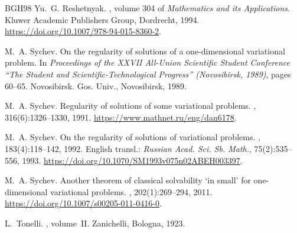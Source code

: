 \documentclass[reqno,12pt]{amsart}
\numberwithin{equation}{section}
\theoremstyle{remark}
\begin{document}
\begin{thebibliography}{BGH98}
Yu.~G. Reshetnyak.
, volume 304 of {\em Mathematics and its Applications}.
\newblock Kluwer Academic Publishers Group, Dordrecht, 1994. \url{https://doi.org/10.1007/978-94-015-8360-2}.

M.~A. Sychev.
\newblock On the regularity of solutions of a one-dimensional variational problem.
\newblock In {\em Proceedings of the {XXVII} {A}ll-{U}nion {S}cientific {S}tudent {C}onference ``{T}he {S}tudent and {S}cientific-{T}echnological {P}rogress'' ({N}ovosibirsk, 1989)}, pages 60--65. Novosibirsk. Gos. Univ., Novosibirsk, 1989.

M.~A. Sychev.
\newblock Regularity of solutions of some variational problems.
, 316(6):1326--1330, 1991. \url{https://www.mathnet.ru/eng/dan6178}.

M.~A. Sychev.
\newblock On the regularity of solutions of variational problems.
, 183(4):118--142, 1992. English transl.: {\em Russian Acad. Sci. Sb. Math.}, 75(2):535--556, 1993. \url{https://doi.org/10.1070/SM1993v075n02ABEH003397}.

M.~A. Sychev.
\newblock Another theorem of classical solvability `in small' for one-dimensional variational problems.
, 202(1):269--294, 2011. \url{https://doi.org/10.1007/s00205-011-0416-0}.

L.~Tonelli.
, volume~II.
\newblock Zanichelli, Bologna, 1923.

\end{thebibliography}
\end{document}
